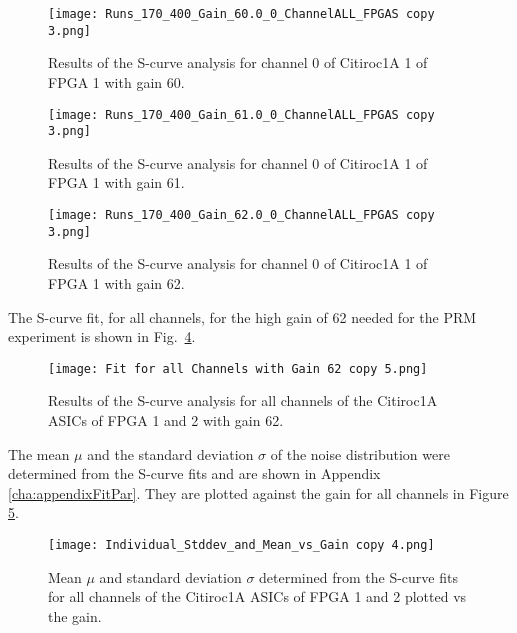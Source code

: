     \begin{figure}[H]
        \centering
        \texttt{[image: Runs\_170\_400\_Gain\_60.0\_0\_ChannelALL\_FPGAS copy 3.png]}
        \caption{Results of the S-curve analysis for channel 0 of Citiroc1A 1 of FPGA 1 with gain 60.}
        \label{fig:S_curve_60}
    \end{figure}
    \begin{figure}[H]
        \centering
        \texttt{[image: Runs\_170\_400\_Gain\_61.0\_0\_ChannelALL\_FPGAS copy 3.png]}
        \caption{Results of the S-curve analysis for channel 0 of Citiroc1A 1 of FPGA 1 with gain 61.}
        \label{fig:S_curve_61}
    \end{figure}
    \begin{figure}[H]
        \centering
        \texttt{[image: Runs\_170\_400\_Gain\_62.0\_0\_ChannelALL\_FPGAS copy 3.png]}
        \caption{Results of the S-curve analysis for channel 0 of Citiroc1A 1 of FPGA 1 with gain 62.}
        \label{fig:S_curve_62}
    \end{figure}
    The S-curve fit, for all channels, for the high gain of 62 needed for the PRM experiment is shown in Fig.~\ref{fig:S_curve_62_ALL}. 
    
    \begin{figure}[H]
        \centering
        \texttt{[image: Fit for all Channels with Gain 62 copy 5.png]}
        \caption{Results of the S-curve analysis for all channels of the Citiroc1A ASICs of FPGA 1 and 2 with gain 62.}
        \label{fig:S_curve_62_ALL}
    \end{figure}
    The mean $\mu$ and the standard deviation $\sigma$ of the noise distribution were determined from the S-curve fits and are shown in Appendix \ref{cha:appendixFitPar}.
    They are plotted against the gain for all channels in Figure \ref{fig:Mean vs gain}.
    \begin{figure}[H]
        \centering
        \texttt{[image: Individual\_Stddev\_and\_Mean\_vs\_Gain copy 4.png]}
        \caption{Mean $\mu$ and standard deviation $\sigma$ determined from the S-curve fits for all channels of the Citiroc1A ASICs of FPGA 1 and 2 plotted vs the gain.}
        \label{fig:Mean vs gain}
    \end{figure}
    
